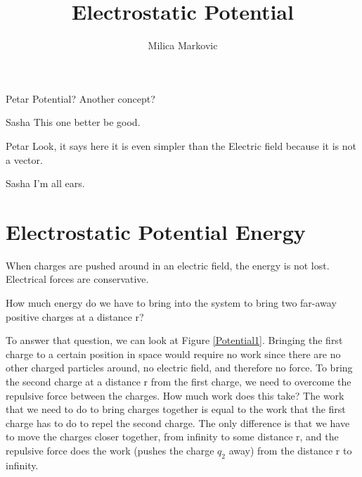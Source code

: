 \documentclass{ximera}
\title{Electrostatic Potential}
\author{Milica Markovic}
\begin{document}
  
\begin{abstract}  

\end{abstract}  
\maketitle    





\begin{dialogue}
\item[Petar] Potential? Another concept?
\item[Sasha] This one better be good.
\item[Petar] Look, it says here it is even simpler than the Electric field because it is not a vector.
\item[Sasha] I'm all ears.
\end{dialogue}


\section{Electrostatic Potential Energy}


When charges are pushed around in an electric field, the energy is not lost. Electrical forces are conservative. 


How much energy do we have to bring into the system to bring two far-away positive charges at a distance r?

To answer that question, we can look at Figure \ref{Potential1}. Bringing the first charge to a certain position in space would require no work since there are no other charged particles around, no electric field, and therefore no force.  To bring the second charge at a distance r from the first charge, we need to overcome the repulsive force between the charges. How much work does this take? 
The work that we need to do to bring charges together is equal to the work that the first charge has to do to repel the second charge. The only difference is that we have to move the charges closer together, from infinity to some distance r, and the repulsive force does the work (pushes the charge $q_2$ away) from the distance r to infinity.
\end{document}
